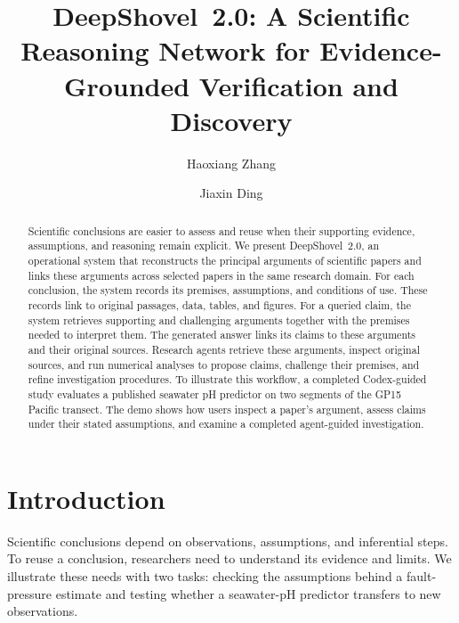 \documentclass[sigconf,screen,review]{acmart}
\newcommand{\sys}{DeepShovel~2.0}
\begin{document}
\raggedbottom
\title[DeepShovel 2.0: Scientific Reasoning Networks]{\sys: A Scientific Reasoning Network for Evidence-Grounded Verification and Discovery}
\author{Haoxiang Zhang}
\author{Jiaxin Ding}
\renewcommand{\shortauthors}{Zhang and Ding}

\begin{abstract}
Scientific conclusions are easier to assess and reuse when their supporting evidence, assumptions, and reasoning remain explicit. We present \sys{}, an operational system that reconstructs the principal arguments of scientific papers and links these arguments across selected papers in the same research domain. For each conclusion, the system records its premises, assumptions, and conditions of use. These records link to original passages, data, tables, and figures. For a queried claim, the system retrieves supporting and challenging arguments together with the premises needed to interpret them. The generated answer links its claims to these arguments and their original sources. Research agents retrieve these arguments, inspect original sources, and run numerical analyses to propose claims, challenge their premises, and refine investigation procedures. To illustrate this workflow, a completed Codex-guided study evaluates a published seawater pH predictor on two segments of the GP15 Pacific transect. The demo shows how users inspect a paper's argument, assess claims under their stated assumptions, and examine a completed agent-guided investigation.
\end{abstract}
\maketitle

\section{Introduction}
Scientific conclusions depend on observations, assumptions, and inferential steps. To reuse a conclusion, researchers need to understand its evidence and limits. We illustrate these needs with two tasks: checking the assumptions behind a fault-pressure estimate and testing whether a seawater-pH predictor transfers to new observations.
\end{document}
